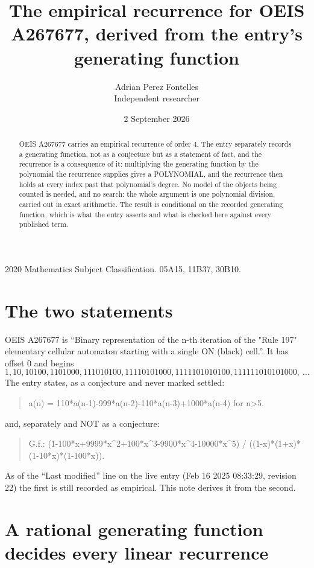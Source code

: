 \documentclass[11pt,a4paper]{article}
\title{The empirical recurrence for OEIS A267677, derived from the entry's generating function}
\author{Adrian Perez Fontelles\\ \small Independent researcher}
\date{2 September 2026}
\theoremstyle{plain}
\theoremstyle{definition}
\begin{document}
\maketitle

\begin{abstract}
OEIS A267677 carries an empirical recurrence of order $4$. The entry separately records a
generating function, not as a conjecture but as a statement of fact, and the recurrence is a
consequence of it: multiplying the generating function by the polynomial the recurrence
supplies gives a POLYNOMIAL, and the recurrence then holds at every index past that
polynomial's degree. No model of the objects being counted is needed, and no search: the
whole argument is one polynomial division, carried out in exact arithmetic. The result is
conditional on the recorded generating function, which is what the entry asserts and what is
checked here against every published term.
\end{abstract}

\noindent\small 2020 Mathematics Subject Classification. 05A15, 11B37, 30B10.\normalsize

\section{The two statements}

OEIS A267677 is ``Binary representation of the n-th iteration of the "Rule 197" elementary cellular automaton starting with a single ON (black) cell.''. It has offset $0$ and begins
\[
1, 10, 10100, 1101000, 111010100, 11110101000, 1111101010100, 111111010101000,\ \dots
\]
The entry states, as a conjecture and never marked settled:
\begin{quote}
a(n) = 110*a(n-1)-999*a(n-2)-110*a(n-3)+1000*a(n-4) for n>5.
\end{quote}
and, separately and NOT as a conjecture:
\begin{quote}
G.f.: (1-100*x+9999*x\^{}2+100*x\^{}3-9900*x\^{}4-10000*x\^{}5) / ((1-x)*(1+x)*(1-10*x)*(1-100*x)).
\end{quote}
As of the ``Last modified'' line on the live entry (Feb 16 2025 08:33:29, revision 22) the first is still
recorded as empirical. This note derives it from the second.

\section{A rational generating function decides every linear recurrence}
\end{document}
